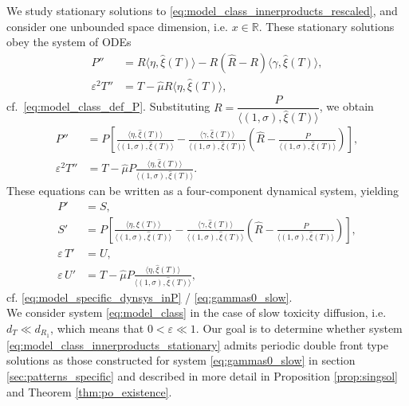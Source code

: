 \documentclass[a4paper,10pt,abstract=true,parskip=true]{scrartcl}
\theoremstyle{remark}
\numberwithin{equation}{section}
\numberwithin{thm}{section}
\newcommand{\eps}{\varepsilon}
\begin{document}
We study stationary solutions to \eqref{eq:model_class_innerproducts_rescaled}, and consider one unbounded space dimension, i.e. $x \in \mathbb{R}$. These stationary solutions obey the system of ODEs
\begin{subequations}
    \begin{align}
        P'' &= R\langle \eta, \hat{\xi}(T) \rangle - R(\hat{R}-R) \langle \gamma, \hat{\xi}(T) \rangle,\\
        \eps^2 T'' &= T- \hat{\mu} R \langle \eta,\hat{\xi}(T) \rangle,
    \end{align}
\end{subequations}
cf.~\eqref{eq:model_class_def_P}. Substituting $R = \dfrac{P}{\langle(1,\sigma),\hat{\xi}(T)\rangle}$, we obtain
\begin{subequations}\label{eq:model_class_innerproducts_stationary_P}
    \begin{align}
        P'' &= P\left[\frac{\langle \eta, \hat{\xi}(T) \rangle}{\langle (1,\sigma), \hat{\xi}(T) \rangle} - \frac{\langle \gamma, \hat{\xi}(T) \rangle}{\langle (1,\sigma), \hat{\xi}(T) \rangle}\left(\hat{R} - \frac{P}{\langle(1,\sigma),\hat{\xi}(T)\rangle}\right)\right],\\
        \eps^2 T'' &= T- \hat{\mu} P \frac{\langle \eta, \hat{\xi}(T) \rangle}{\langle (1,\sigma), \hat{\xi}(T) \rangle}.
    \end{align}
\end{subequations}
These equations can be written as a four-component dynamical system, yielding
\begin{subequations}\label{eq:model_class_innerproducts_stationary}
    \begin{align}
        P' &= S,\\
        S' &= P\left[\frac{\langle \eta, \hat{\xi}(T) \rangle}{\langle (1,\sigma), \hat{\xi}(T) \rangle} - \frac{\langle \gamma, \hat{\xi}(T) \rangle}{\langle (1,\sigma), \hat{\xi}(T) \rangle}\left(\hat{R} - \frac{P}{\langle(1,\sigma),\hat{\xi}(T)\rangle}\right)\right],\\
        \eps\,T' &= U,\\
        \eps\,U' &= T- \hat{\mu} P \frac{\langle \eta, \hat{\xi}(T) \rangle}{\langle (1,\sigma), \hat{\xi}(T) \rangle},
    \end{align}
\end{subequations}
cf. \eqref{eq:model_specific_dynsys_inP} / \eqref{eq:gammas0_slow}.\\ 

We consider system \eqref{eq:model_class} in the case of slow toxicity diffusion, i.e. $d_T \ll d_{R_1}$, which means that $0<\eps \ll 1$. Our goal is to determine whether system \eqref{eq:model_class_innerproducts_stationary} admits periodic double front type solutions as those constructed for system \eqref{eq:gammas0_slow} in section \ref{sec:patterns_specific} and described in more detail in Proposition \ref{prop:singsol} and Theorem \ref{thm:po_existence}.\\
\end{document}

